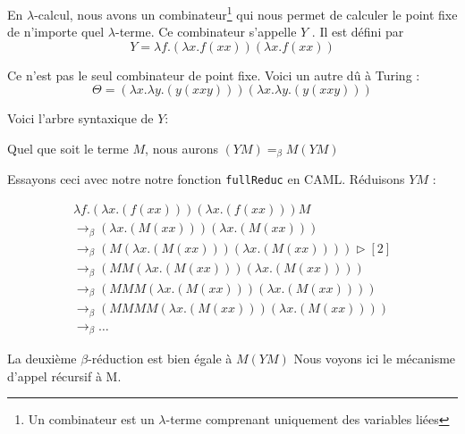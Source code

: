 \documentclass[11pt]{book}
\begin{document}
En $\lambda $-calcul, nous avons un combinateur\footnote{Un combinateur est un $\lambda$-terme comprenant uniquement 
des variables li\'{e}es} qui nous permet de calculer le point fixe de n'importe quel $\lambda $-terme.
Ce combinateur s'appelle $Y$ . Il est défini par $$ Y=  \lambda f.(\lambda x.f(x x))(\lambda x.f(x x)) $$


Ce n'est pas le seul combinateur de point fixe. Voici un autre d\^{u} \`{a} Turing :
 $$\Theta = (\lambda x. \lambda y. (y (x x y))) (\lambda x. \lambda y. (y (x x y)))$$


Voici l'arbre syntaxique de $Y$:
\begin{center}
\end{center}
Quel que soit le terme $M$, nous aurons  $(YM) = _\beta M(YM)$



Essayons ceci avec notre notre fonction \verb+fullReduc+  en CAML.
Réduisons $YM$ :

$$
\begin{array}{l}
\lambda f . (\lambda x . (f (x x))) (\lambda x . (f (x x))) M \\
\rightarrow _\beta (\lambda x . (M (xx)))(\lambda x . (M(xx))) \\
\rightarrow _\beta  (M(\lambda x . (M(xx)))(\lambda x . (M(xx))))  \triangleright [2] \\
\rightarrow _\beta  (MM(\lambda x . (M(xx)))(\lambda x . (M(xx)))) \\
\rightarrow _\beta  (MMM(\lambda x . (M(xx)))(\lambda x . (M(xx)))) \\
\rightarrow _\beta  (MMMM(\lambda x . (M(xx)))(\lambda x . (M(xx)))) \\
\rightarrow _\beta  \ldots
\end{array}
$$


La deuxième $\beta$-r\'{e}duction est bien \'{e}gale \`{a} $M (Y M)$
Nous voyons ici le mécanisme d'appel récursif à M. 
\end{document}
